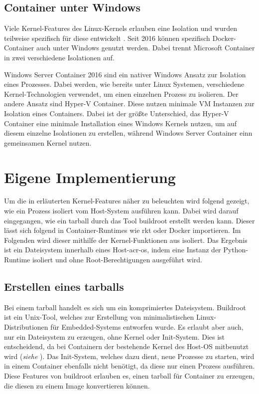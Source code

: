 \subsection{Container unter Windows}
\label{sec:windows}
Viele Kernel-Features des Linux-Kernels erlauben eine Isolation und wurden teilweise spezifisch für diese entwickelt \citep{Namespaces7LinuxManualPage}. Seit 2016 können spezifisch Docker-Container auch unter Windows genutzt werden. Dabei trennt Microsoft Container in zwei verschiedene Isolationen auf.

Windows Server Container 2016 sind ein nativer Windows Ansatz zur Isolation eines Prozesses. Dabei werden, wie bereits unter Linux Systemen, verschiedene Kernel-Technologien verwendet, um einen einzelnen Prozess zu isolieren. Der andere Ansatz sind Hyper-V Container. Diese nutzen minimale VM Instanzen zur Isolation eines Containers. Dabei ist der größte Unterschied, das Hyper-V Container eine minimale Installation eines Windows Kernels nutzen, um auf diesem einzelne Isolationen zu erstellen, während Windows Server Container einn gemeinsamen Kernel nutzen.

\section{Eigene Implementierung}
\label{sec:eigeneImpl}
Um die in  erläuterten Kernel-Features näher zu beleuchten wird folgend gezeigt, wie ein Prozess isoliert vom Host-System ausführen kann. Dabei wird darauf eingegangen, wie ein tarball durch das Tool buildroot erstellt werden kann. Dieser lässt sich folgend in Container-Runtimes wie rkt oder Docker importieren. Im Folgenden wird dieser mithilfe der Kernel-Funktionen aus  isoliert. Das Ergebnis ist ein Dateisystem innerhalb eines Host-\gls{acr-os}, indem  eine Instanz der Python-Runtime isoliert und ohne Root-Berechtigungen ausgeführt wird.

\subsection{Erstellen eines tarballs}
\label{sec:tarball}
Bei einem tarball handelt es sich um ein komprimiertes Dateisystem. Buildroot ist ein Unix-Tool, welches zur Erstellung von minimalistischen Linux-Distributionen für Embedded-Systems entworfen wurde. Es erlaubt aber auch, nur ein Dateisystem zu erzeugen, ohne Kernel oder Init-System. Dies ist entscheidend, da bei Containern der bestehende Kernel des Host-OS mitbenutzt wird (\textit{siehe }). Das Init-System, welches dazu dient, neue Prozesse zu starten, wird in einem Container ebenfalls nicht benötigt, da diese nur einen Prozess ausführen. Diese Features von buildroot erlauben es, einen tarball für Container zu erzeugen, die diesen zu einem Image konvertieren können.

